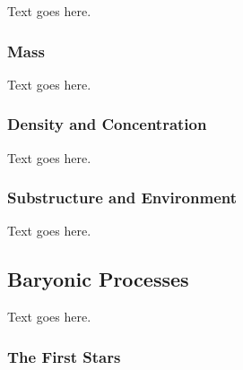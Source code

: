 Text goes here.



\subsubsection{Mass}
\label{subsubsec:early_universe--halo_properties--mass}


Text goes here.



\subsubsection{Density and Concentration}
\label{subsubsec:early_universe--halo_properties--density}


Text goes here.



\subsubsection{Substructure and Environment}
\label{subsubsec:early_universe--halo_properties--structure}


Text goes here.




\subsection{Baryonic Processes}
\label{subsec:early_universe--baryonic_processes}


Text goes here.



\subsubsection{The First Stars}
\label{subsubsec:early_universe--baryonic_processes--first_stars}


